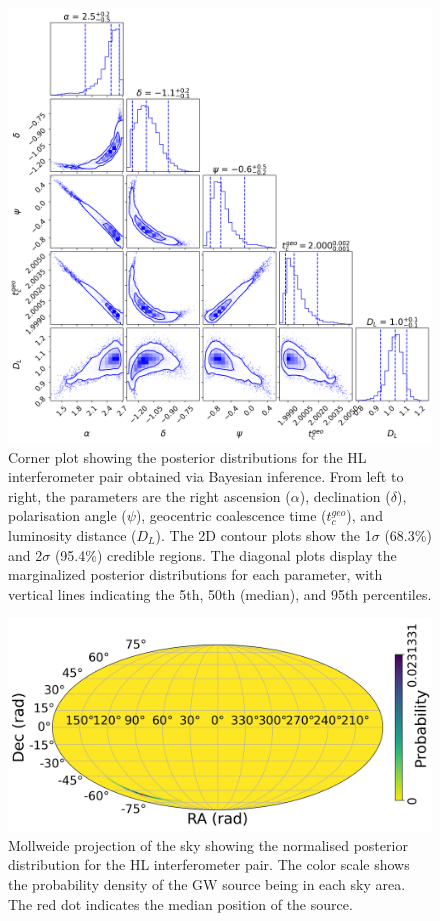\documentclass[11pt,a4paper]{article}
\begin{document}
\begin{figure}
    \includegraphics[width=\columnwidth, keepaspectratio]{../figures/corner_HL.png}
    \caption{Corner plot showing the posterior distributions for the HL interferometer pair obtained via Bayesian inference. From left to right, the parameters are the right ascension ($\alpha$), declination ($\delta$), polarisation angle ($\psi$), geocentric coalescence time ($t_c^{geo}$), and luminosity distance ($D_L$). The 2D contour plots show the 1$\sigma$ (68.3\%) and 2$\sigma$ (95.4\%) credible regions. The diagonal plots display the marginalized posterior distributions for each parameter, with vertical lines indicating the 5th, 50th (median), and 95th percentiles.}
    \label{fig:posterior_hl}
\end{figure}

\begin{figure}
    \includegraphics[width=\columnwidth, keepaspectratio]{../figures/posterior_map_HL.png}
    \caption{Mollweide projection of the sky showing the normalised posterior distribution for the HL interferometer pair. The color scale shows the probability density of the GW source being in each sky area. The red dot indicates the median position of the source.}
    \label{fig:sky_hl}
\end{figure}
\end{document}
